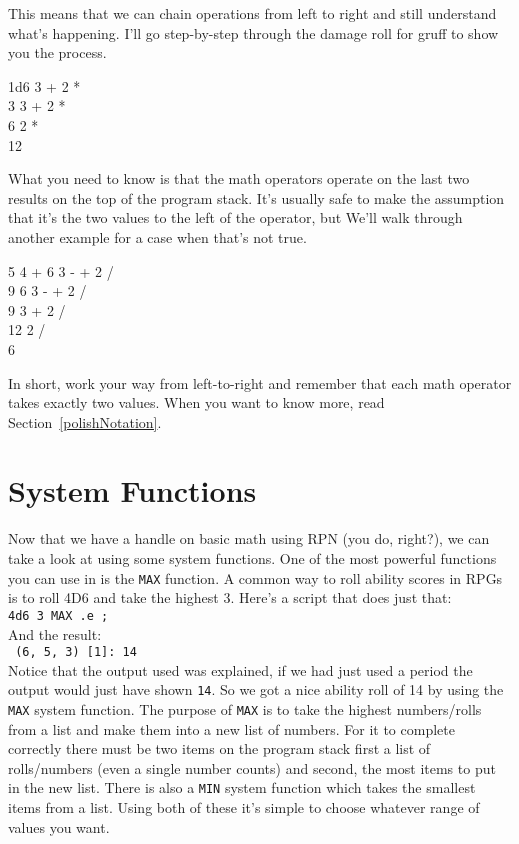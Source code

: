 This means that we can chain operations from left to right and still
understand what's happening. I'll go step-by-step through the
damage roll for gruff to show you the process.
\begin{center}
\begin{texttt}
1d6 3 + 2 *\\
3 3 + 2 *\\
6 2 *\\
12\\
\end{texttt}
\end{center}
What you need to know is that the math operators operate on the last two results
on the top of the program stack. It's usually safe to make the assumption that
it's the two values to the left of the operator, but We'll walk through another
example for a case when that's not true.
\begin{center}
\begin{texttt}
5 4 + 6 3 - + 2 /\\
9 6 3 - + 2 /\\
9 3 + 2 /\\
12 2 /\\
6\\
\end{texttt}
\end{center}
In short, work your way from left-to-right and remember that each math operator
takes exactly two values. When you want to know more, read 
Section~\ref{polishNotation}.

\section{System Functions}
\label{firstFunction}
Now that we have a handle on basic math using RPN (you do, right?), we can
take a look at using some system functions. One of the most powerful functions
you can use in \progLogo is the \texttt{MAX} function. A common way to roll
ability scores in RPGs is to roll 4D6 and take the highest 3. Here's a
script that does just that:\\
\indent\texttt{4d6 3 MAX .e ;}\\
And the result:\\
\indent\texttt{ (6, 5, 3) [1]: 14}\\
Notice that the output used was explained, if we had just used a period the
output would just have shown \texttt{14}. So we got a nice ability roll of 14
by using the \texttt{MAX} system function. The purpose of \texttt{MAX} is to take the
highest numbers/rolls from a list and make them into a new list of numbers. For
it to complete correctly there must be two items on the program stack first a
list of rolls/numbers (even a single number counts) and second, the most
items to put in the new list. There is also a \texttt{MIN} system function
which takes the smallest items from a list. Using both of these it's simple
to choose whatever range of values you want.

